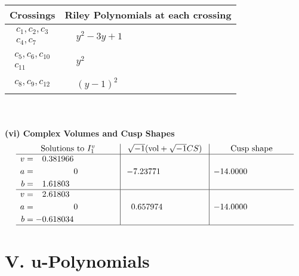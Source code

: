 \documentclass[1p]{elsarticle_modified}
\theoremstyle{definition}
\newcommand{\I}{\sqrt{-1}}
\begin{document}
\begin{tabular}{m{50pt}|m{274pt}}
Crossings & \hspace{64pt}Riley Polynomials at each crossing \\
\hline $$\begin{aligned}c_{1},c_{2},c_{3}\\c_{4},c_{7}\end{aligned}$$&$\begin{aligned}
&y^2-3 y+1
\end{aligned}$\\
\hline $$\begin{aligned}c_{5},c_{6},c_{10}\\c_{11}\end{aligned}$$&$\begin{aligned}
&y^2
\end{aligned}$\\
\hline $$\begin{aligned}c_{8},c_{9},c_{12}\end{aligned}$$&$\begin{aligned}
&(y-1)^2
\end{aligned}$\\
\hline
\end{tabular}\\~\\
\newpage\flushleft \textbf{(vi) Complex Volumes and Cusp Shapes}
$$\begin{array}{c|c|c}  
\text{Solutions to }I^v_{1}& \I (\text{vol} + \sqrt{-1}CS) & \text{Cusp shape}\\
 \hline 
\begin{aligned}
v &= \phantom{-}0.381966\phantom{ +0.000000I} \\
a &= \phantom{-0.000000 } 0 \\
b &= \phantom{-}1.61803\phantom{ +0.000000I}\end{aligned}
 & -7.23771\phantom{ +0.000000I} & -14.0000\phantom{ +0.000000I} \\ \hline\begin{aligned}
v &= \phantom{-}2.61803\phantom{ +0.000000I} \\
a &= \phantom{-0.000000 } 0 \\
b &= -0.618034\phantom{ +0.000000I}\end{aligned}
 & \phantom{-}0.657974\phantom{ +0.000000I} & -14.0000\phantom{ +0.000000I}\\
 \hline 
 \end{array}$$\newpage
\newpage\renewcommand{\arraystretch}{1}
\centering \section*{ V. u-Polynomials}
\end{document}
